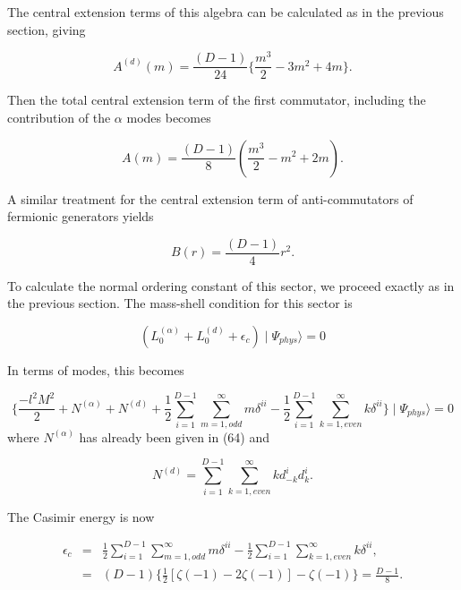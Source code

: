 \documentclass[a4paper,a4paper]{article}
\begin{document}
The central extension terms of this algebra can be calculated as
in the previous section, giving

\begin{equation}
A^{(d)}(m)=\frac{(D-1)}{24}\{\frac{m^{3}}{2}-3m^{2}+4m\}.
\end{equation}

Then the total central extension term of the first commutator,
including the contribution of the $\alpha$ modes becomes

\begin{equation}
A(m)=\frac{(D-1)}{8}(\frac{m^{3}}{2}-m^{2}+2m).
\end{equation}

A similar treatment for the central extension term of
anti-commutators of fermionic generators yields

\begin{equation}
B(r)=\frac{(D-1)}{4}r^{2}.
\end{equation}

To calculate the normal ordering constant of this sector, we
proceed exactly as in the previous section.  The mass-shell
condition for this sector is

\begin{equation}
(L_{0}^{(\alpha)}+L_{0}^{(d)}+\epsilon_{c})\mid\Psi_{phys}\rangle=0
\end{equation}

In terms of modes, this becomes

\begin{equation}
\{\frac{-l^{2}M^{2}}{2}+N^{(\alpha)}+N^{(d)}+\frac{1}{2}
\sum_{i=1}^{D-1}\sum_{m=1,odd}^{\infty}m\delta^{ii}-
\frac{1}{2}\sum_{i=1}^{D-1}\sum_{k=1,even}^{\infty}k
\delta^{ii}\}\mid\Psi_{phys}\rangle = 0
\end{equation}
where $N^{(\alpha)}$ has already been given in (64) and

\begin{equation}
N^{(d)}=\sum_{i=1}^{D-1}\sum_{k=1,even}^{\infty}kd_{-k}^{i}d_{k}^{i}.
\end{equation}

The Casimir energy is now

\begin{eqnarray}
\epsilon_{c}&=&\frac{1}{2}\sum_{i=1}^{D-1}\sum_{m=1,odd}^{\infty}m\delta^{ii}-\frac{1}{2}\sum_{i=1}^{D-1}\sum_{k=1,even}^{\infty}k\delta^{ii},\\
            &=&(D-1)\{\frac{1}{2}[\zeta(-1)-2\zeta(-1)]-\zeta(-1)\}=\frac{D-1}{8}.
\end{eqnarray}
\end{document}
